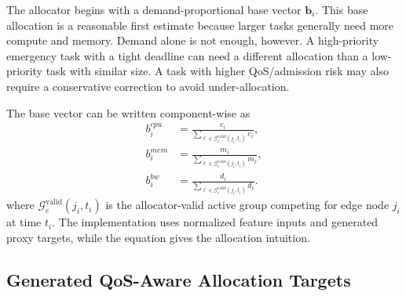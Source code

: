 The allocator begins with a demand-proportional base vector $\mathbf{b}_i$. This base allocation is a reasonable first estimate because larger tasks generally need more compute and memory. Demand alone is not enough, however. A high-priority emergency task with a tight deadline can need a different allocation than a low-priority task with similar size. A task with higher QoS/admission risk may also require a conservative correction to avoid under-allocation.

The base vector can be written component-wise as
\begin{equation}
\begin{aligned}
b_i^{cpu} &=
\frac{c_i}{\sum_{\ell\in\mathcal{G}^{\mathrm{valid}}_e(j_i,t_i)}c_\ell},\\
b_i^{mem} &=
\frac{m_i}{\sum_{\ell\in\mathcal{G}^{\mathrm{valid}}_e(j_i,t_i)}m_\ell},\\
b_i^{bw} &=
\frac{d_i}{\sum_{\ell\in\mathcal{G}^{\mathrm{valid}}_e(j_i,t_i)}d_\ell}.
\end{aligned}
\label{eq:base_alloc}
\end{equation}
where $\mathcal{G}^{\mathrm{valid}}_e(j_i,t_i)$ is the allocator-valid active group competing for edge node $j_i$ at time $t_i$. The implementation uses normalized feature inputs and generated proxy targets, while the equation gives the allocation intuition.

\subsection{Generated QoS-Aware Allocation Targets}

